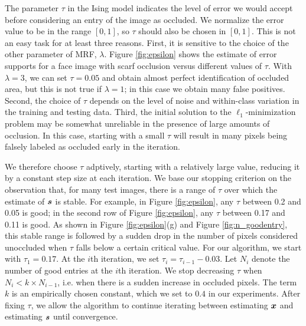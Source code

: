 The parameter $\tau$ in the Ising model indicates the level
of error we would accept before considering an entry of the image as occluded. We
normalize the error value to be in the range $[0,1]$, so $\tau$
should also be chosen in $[0,1]$. This is not an easy
task for at least three reasons. First, it is sensitive to the
choice of the other parameter of MRF, $\lambda$. Figure
\ref{fig:epsilon} shows the estimate of error supports for a face
image with scarf occlusion versus different values of $\tau$.
With $\lambda = 3$, we can set $\tau=0.05$ and obtain almost perfect
identification of occluded area, but this is not true if $\lambda =
1$; in this case we obtain many false positives. Second, the choice of
$\tau$ depends on the level of noise and within-class variation in the
training and testing data. Third, the initial solution to
the $\ell_1$-minimization problem may be somewhat unreliable in the
presence of large amounts of occlusion.
In this case, starting with a small $\tau$ will result in many pixels being
falsely labeled as occluded early in the iteration.

We therefore choose $\tau$ adptively, starting with a
relatively large value, reducing it by a constant step size
at each iteration. We base our stopping criterion on the observation that, for many test images, there is a
range of $\tau$ over which the estimate of $\boldsymbol{s}$ is stable.
For example, in Figure \ref{fig:epsilon}, any $\tau$ between 0.2 and 0.05 is good; in
the second row of Figure \ref{fig:epsilon}, any $\tau$ between
0.17 and 0.11 is good. As shown in Figure \ref{fig:epsilon}(g) and
Figure \ref{fig:n_goodentry}, this stable range is followed by a sudden drop in the
number of pixels considered unoccluded when $\tau$ falls below a certain critical value.
For our algorithm, we start with $\tau_1 = 0.17$. At the $i$th
iteration, we set $\tau_i = \tau_{i-1}-0.03$. Let $N_i$
denote the number of good entries at the $i$th iteration. We stop
decreasing $\tau$ when $N_i < k \times N_{i-1}$, i.e. when there is a sudden increase in occluded pixels.  The term $k$ is an
empirically chosen constant, which we set to $0.4$ in our experiments.
After fixing $\tau$, we allow the algorithm to continue iterating
between estimating ${\boldsymbol{x}}$ and estimating $\boldsymbol{s}$ until convergence.

